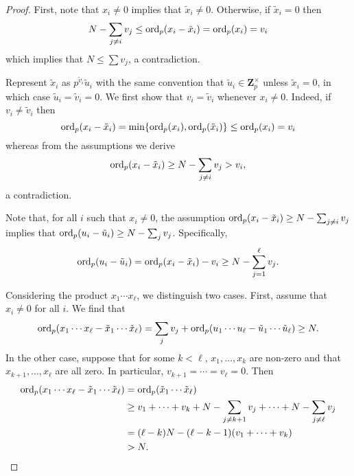 \begin{proof}
First, note that $x_i \neq 0$ implies that $\tilde{x}_i \neq 0$. 
Otherwise, if $\tilde{x}_i = 0$ then
\begin{equation*}
N - \sum_{j \neq i} v_j \leq \operatorname{ord}_p(x_i - \tilde{x}_i) = \operatorname{ord}_p(x_i) = v_i
\end{equation*}
which implies that $N \leq \sum v_j$, a contradiction.

Represent $\tilde{x}_i$ as $p^{\tilde{v}_i} \tilde{u}_i$ with the 
same convention that $\tilde{u}_i \in \mathbf{Z}_p^{\times}$ unless 
$\tilde{x}_i = 0$, in which case $\tilde{u}_i = \tilde{v}_i = 0$.  
We first show that $v_i = \tilde{v}_i$ whenever $x_i \neq 0$.  Indeed, 
if $v_i \neq \tilde{v}_i$ then 
\begin{equation*}
\operatorname{ord}_p(x_i - \tilde{x}_i) = \min\{\operatorname{ord}_p(x_i), \operatorname{ord}_p(\tilde{x}_i)\} \leq \operatorname{ord}_p(x_i) = v_i
\end{equation*}
whereas from the assumptions we derive 
\begin{equation*}
\operatorname{ord}_p(x_i - \tilde{x}_i) \geq N - \sum_{j \neq i} v_j > v_i,
\end{equation*}
a contradiction.

Note that, for all $i$ such that $x_i \neq 0$, the assumption 
$\operatorname{ord}_p(x_i - \tilde{x}_i) \geq N - \sum_{j \neq i} v_j$ implies that 
$\operatorname{ord}_p(u_i - \tilde{u}_i) \geq N - \sum_j v_j$.  Specifically, 
\begin{equation*}
\operatorname{ord}_p(u_i - \tilde{u}_i) = \operatorname{ord}_p(x_i - \tilde{x}_i) - v_i \geq N - \sum_{j=1}^{\ell} v_j.
\end{equation*}

Considering the product $x_1 \dotsm x_{\ell}$, we distinguish two 
cases.  First, assume that $x_i \neq 0$ for all $i$.  We find that 
\begin{equation*}
\operatorname{ord}_p(x_1 \dotsm x_{\ell} - \tilde{x}_1 \dotsm \tilde{x}_{\ell}) = 
    \sum_{j} v_j + \operatorname{ord}_p(u_1 \dotsm u_{\ell} - \tilde{u}_1 \dotsm \tilde{u}_{\ell}) \geq N.
\end{equation*}
In the other case, suppose that for some $k < \ell$, $x_1, \dotsc, x_k$ 
are non-zero and that $x_{k+1}, \dotsc, x_{\ell}$ are all zero.  In 
particular, $v_{k+1} = \dotsb = v_{\ell} = 0$.  Then 
\begin{equation*}
\begin{split}
\operatorname{ord}_p(x_1 \dotsm x_{\ell} - \tilde{x}_1 \dotsm \tilde{x}_{\ell}) 
  & = \operatorname{ord}_p(\tilde{x}_1 \dotsm \tilde{x}_{\ell}) \\
  & \geq v_1 + \dotsb + v_k + N - \sum_{j \neq k+1} v_j + \dotsb + N - \sum_{j \neq \ell} v_j \\
  & = (\ell - k) N - (\ell - k - 1) (v_1 + \dotsb + v_k) \\
  & > N. \qedhere
\end{split}
\end{equation*}
\end{proof}

